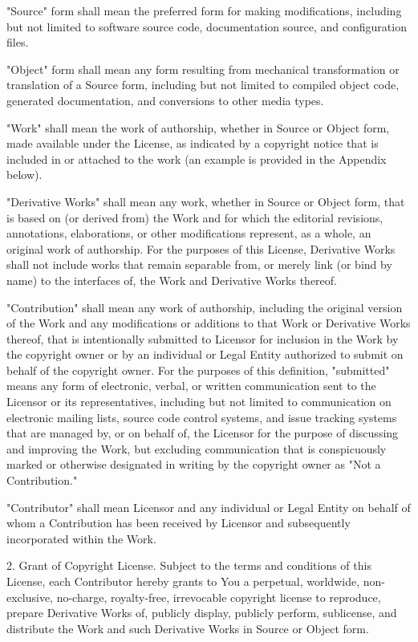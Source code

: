 \documentclass[10pt]{article}
\begin{document}
      "Source" form shall mean the preferred form for making modifications,
      including but not limited to software source code, documentation
      source, and configuration files.

      "Object" form shall mean any form resulting from mechanical
      transformation or translation of a Source form, including but
      not limited to compiled object code, generated documentation,
      and conversions to other media types.

      "Work" shall mean the work of authorship, whether in Source or
      Object form, made available under the License, as indicated by a
      copyright notice that is included in or attached to the work
      (an example is provided in the Appendix below).

      "Derivative Works" shall mean any work, whether in Source or Object
      form, that is based on (or derived from) the Work and for which the
      editorial revisions, annotations, elaborations, or other modifications
      represent, as a whole, an original work of authorship. For the purposes
      of this License, Derivative Works shall not include works that remain
      separable from, or merely link (or bind by name) to the interfaces of,
      the Work and Derivative Works thereof.

      "Contribution" shall mean any work of authorship, including
      the original version of the Work and any modifications or additions
      to that Work or Derivative Works thereof, that is intentionally
      submitted to Licensor for inclusion in the Work by the copyright owner
      or by an individual or Legal Entity authorized to submit on behalf of
      the copyright owner. For the purposes of this definition, "submitted"
      means any form of electronic, verbal, or written communication sent
      to the Licensor or its representatives, including but not limited to
      communication on electronic mailing lists, source code control systems,
      and issue tracking systems that are managed by, or on behalf of, the
      Licensor for the purpose of discussing and improving the Work, but
      excluding communication that is conspicuously marked or otherwise
      designated in writing by the copyright owner as "Not a Contribution."

      "Contributor" shall mean Licensor and any individual or Legal Entity
      on behalf of whom a Contribution has been received by Licensor and
      subsequently incorporated within the Work.

   2. Grant of Copyright License. Subject to the terms and conditions of
      this License, each Contributor hereby grants to You a perpetual,
      worldwide, non-exclusive, no-charge, royalty-free, irrevocable
      copyright license to reproduce, prepare Derivative Works of,
      publicly display, publicly perform, sublicense, and distribute the
      Work and such Derivative Works in Source or Object form.
\end{document}
